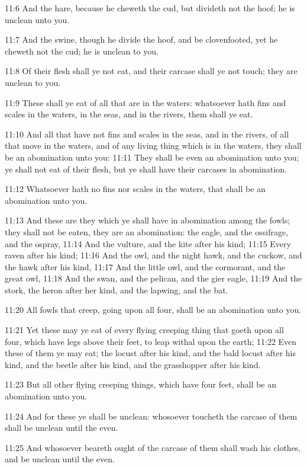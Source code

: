 11:6 And the hare, because he cheweth the cud, but divideth not the hoof; he is unclean unto you.

11:7 And the swine, though he divide the hoof, and be clovenfooted, yet he cheweth not the cud; he is unclean to you.

11:8 Of their flesh shall ye not eat, and their carcase shall ye not touch; they are unclean to you.

11:9 These shall ye eat of all that are in the waters: whatsoever hath fins and scales in the waters, in the seas, and in the rivers, them shall ye eat.

11:10 And all that have not fins and scales in the seas, and in the rivers, of all that move in the waters, and of any living thing which is in the waters, they shall be an abomination unto you: 11:11 They shall be even an abomination unto you; ye shall not eat of their flesh, but ye shall have their carcases in abomination.

11:12 Whatsoever hath no fins nor scales in the waters, that shall be an abomination unto you.

11:13 And these are they which ye shall have in abomination among the fowls; they shall not be eaten, they are an abomination: the eagle, and the ossifrage, and the ospray, 11:14 And the vulture, and the kite after his kind; 11:15 Every raven after his kind; 11:16 And the owl, and the night hawk, and the cuckow, and the hawk after his kind, 11:17 And the little owl, and the cormorant, and the great owl, 11:18 And the swan, and the pelican, and the gier eagle, 11:19 And the stork, the heron after her kind, and the lapwing, and the bat.

11:20 All fowls that creep, going upon all four, shall be an abomination unto you.

11:21 Yet these may ye eat of every flying creeping thing that goeth upon all four, which have legs above their feet, to leap withal upon the earth; 11:22 Even these of them ye may eat; the locust after his kind, and the bald locust after his kind, and the beetle after his kind, and the grasshopper after his kind.

11:23 But all other flying creeping things, which have four feet, shall be an abomination unto you.

11:24 And for these ye shall be unclean: whosoever toucheth the carcase of them shall be unclean until the even.

11:25 And whosoever beareth ought of the carcase of them shall wash his clothes, and be unclean until the even.

